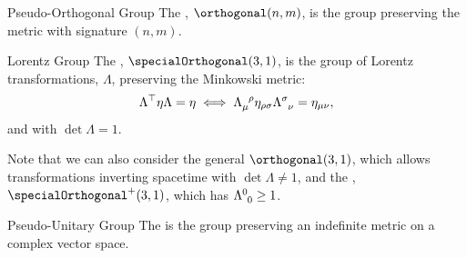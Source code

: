 \documentclass[fleqn]{NotesClass}
\newcommand{\minkowskiMetric}{\eta}
\newcommand{\trans}{\top}
\begin{document}
    \begin{dfn}{Pseudo-Orthogonal Group}{}
        The , \(\orthogonal(n, m)\), is the group preserving the metric with signature \((n, m)\).
    \end{dfn}
    
    \begin{exm}{Lorentz Group}{}
        The , \(\specialOrthogonal(3, 1)\), is the group of Lorentz transformations, \(\Lambda\), preserving the Minkowski metric:
        \begin{equation}
            \Lambda^\trans \minkowskiMetric \Lambda = \minkowskiMetric \iff \tensor{\Lambda}{_\mu^\rho} \minkowskiMetric_{\rho\sigma} \tensor{\Lambda}{^\sigma_\nu} = \minkowskiMetric_{\mu\nu},
        \end{equation}
        and with \(\det \Lambda = 1\).
        
        Note that we can also consider the general  \(\orthogonal(3, 1)\), which allows transformations inverting spacetime with \(\det \Lambda \ne 1\), and the , \(\specialOrthogonal^+(3, 1)\), which has \(\tensor{\Lambda}{^0_0} \ge 1\).
    \end{exm}
    
    \begin{dfn}{Pseudo-Unitary Group}{}
        The  is the group preserving an indefinite metric on a complex vector space.
    \end{dfn}
    
\end{document}
